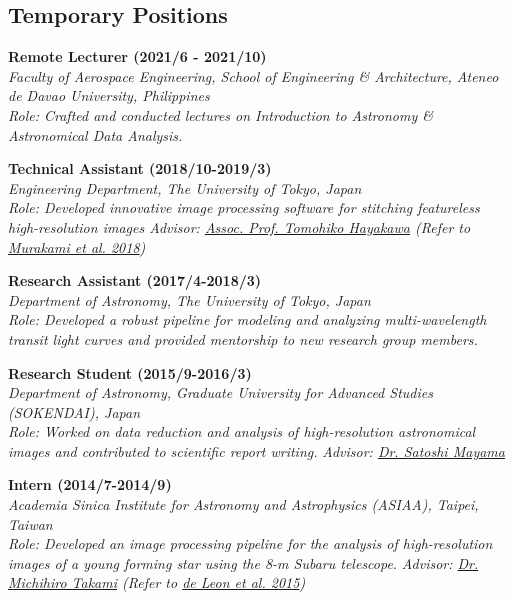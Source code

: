 \documentclass[12pt,letterpaper]{article}
\begin{document}
\subsection{Temporary Positions}
\begin{list}{}{\cvlist}
    \item
        \textbf{Remote Lecturer (2021/6 - 2021/10)} \\
        \textit{Faculty of Aerospace Engineering, School of Engineering \& Architecture, Ateneo de Davao University, Philippines} \\
        \textit{Role: Crafted and conducted lectures on Introduction to Astronomy \& Astronomical Data Analysis.}
        
    \item 
        \textbf{Technical Assistant (2018/10-2019/3)}\\
        \textit{Engineering Department, The University of Tokyo, Japan}\\
        \textit{Role: Developed innovative image processing software for stitching featureless high-resolution images 
        \textit{Advisor: \href{hayakawaurl}{Assoc. Prof. Tomohiko Hayakawa}} (Refer to \href{\spieurl}{Murakami et al. 2018})}

    \item 
        \textbf{Research Assistant (2017/4-2018/3)}\\	
        \textit{Department of Astronomy, The University of Tokyo, Japan}\\
        \textit{Role: Developed a robust pipeline for modeling and analyzing multi-wavelength transit light curves and provided mentorship to new research group members.}

    \item 
        \textbf{Research Student (2015/9-2016/3)}\\
        \textit{Department of Astronomy, Graduate University for Advanced Studies (SOKENDAI), Japan}\\
        \textit{Role: Worked on data reduction and analysis of high-resolution astronomical images and contributed to scientific report writing.}
        \textit{Advisor: \href{\mayamaurl}{Dr. Satoshi Mayama}} \\

    \item 
        \textbf{Intern (2014/7-2014/9)}\\
        \textit{Academia Sinica Institute for Astronomy and Astrophysics (ASIAA), Taipei, Taiwan}\\	
        \textit{Role: Developed an image processing pipeline for the analysis of high-resolution images of a young forming star using the 8-m Subaru telescope.}
        \textit{Advisor: \href{takamiurl}{Dr. Michihiro Takami} (Refer to \href{\paperone}{de Leon et al. 2015})} \\
\end{list}
\end{document}
